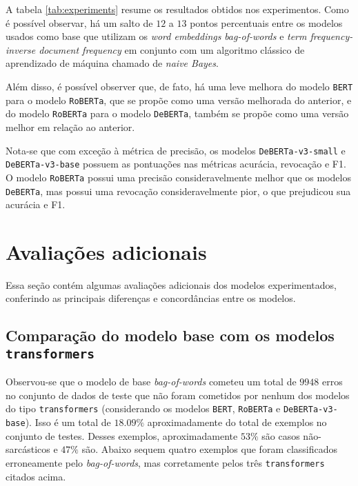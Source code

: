 A tabela \ref{tab:experiments} resume os resultados obtidos nos experimentos.
Como é possível observar, há um salto de $12$ a $13$ pontos percentuais entre os
modelos usados como base que utilizam os \textit{word embeddings}
\textit{bag-of-words} e \textit{term frequency-inverse document frequency} em
conjunto com um algoritmo clássico de aprendizado de máquina chamado de
\textit{naive Bayes}.

Além disso, é possível observer que, de fato, há uma leve melhora do modelo
\texttt{BERT} para o modelo \texttt{RoBERTa}, que se propõe como uma versão
melhorada do anterior, e do modelo \texttt{RoBERTa} para o modelo
\texttt{DeBERTa}, também se propõe como uma versão melhor em relação ao
anterior.

Nota-se que com exceção à métrica de precisão, os modelos
\texttt{DeBERTa-v3-small} e \texttt{DeBERTa-v3-base} possuem as pontuações nas
métricas acurácia, revocação e F1. O modelo \texttt{RoBERTa} possui uma precisão
consideravelmente melhor que os modelos \texttt{DeBERTa}, mas possui uma
revocação consideravelmente pior, o que prejudicou sua acurácia e F1.

\section{Avaliações adicionais}%
\label{sec:avaliacoes_adicionais}

Essa seção contém algumas avaliações adicionais dos modelos experimentados,
conferindo as principais diferenças e concordâncias entre os modelos.

\subsection{Comparação do modelo base com os modelos \texttt{transformers}}%
\label{sub:comparacao_do_modelo_base_com_os_modelos_transformers}

Observou-se que o modelo de base \textit{bag-of-words} cometeu um total de
$9948$ erros no conjunto de dados de teste que não foram cometidos por nenhum
dos modelos do tipo \texttt{transformers} (considerando os modelos
\texttt{BERT}, \texttt{RoBERTa} e \texttt{DeBERTa-v3-base}). Isso é um total de
$18.09\%$ aproximadamente do total de exemplos no conjunto de testes. Desses
exemplos, aproximadamente $53\%$ são casos não-sarcásticos e $47\%$ são. Abaixo
sequem quatro exemplos que foram classificados erroneamente pelo
\textit{bag-of-words}, mas corretamente pelos três \texttt{transformers} citados
acima. \jump

